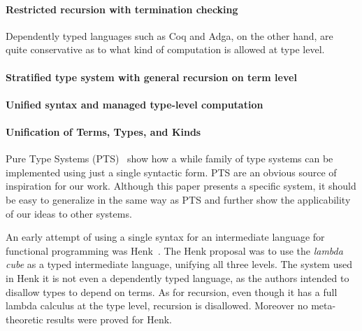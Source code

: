 \paragraph{Restricted recursion with termination checking}

Dependently typed languages such as Coq and Adga, on the other hand,
are quite conservative as to what kind of computation is allowed at
type level.

\paragraph{Stratified type system with general recursion on term level}

\paragraph{Unified syntax and managed type-level computation}

\paragraph{Unification of Terms, Types, and Kinds}
Pure Type Systems (PTS)~\cite{pts} show how a while family of type systems
can be implemented using just a single syntactic form. PTS are an
obvious source of inspiration for our work. Although this paper
presents a specific system, it should be easy to generalize \name 
in the same way as PTS and further show the applicability of our 
ideas to other systems. 

An early attempt of using a single syntax for an intermediate language
for functional programming was Henk~\cite{pts:henk}. The Henk proposal
was to use the \emph{lambda cube} as a typed intermediate language,
unifying all three levels. The system used in Henk
it is not even a dependently typed
language, as the authors intended to  disallow types to depend
on terms. As for recursion, even though it has a full lambda calculus
at the type level, recursion is disallowed. Moreover no meta-theoretic 
results were proved for Henk.

\begin{comment}
Since the implicit conversion of the lambda
cube is not syntax-directed, they come up with a approach to
strategically distribute the conversion rule over the other typing
rules. In retrospect, Henk is quite conservative in terms of
type-level computation. Actually it is not even a dependently typed
language, as they clearly state that they don't allow types to depend
on terms. As for recursion, even though it has a full lambda calculus
at the type level, recursion is disallowed. In Henk the authors have
not attempted to prove any meta-theoretic results.
\end{comment}

